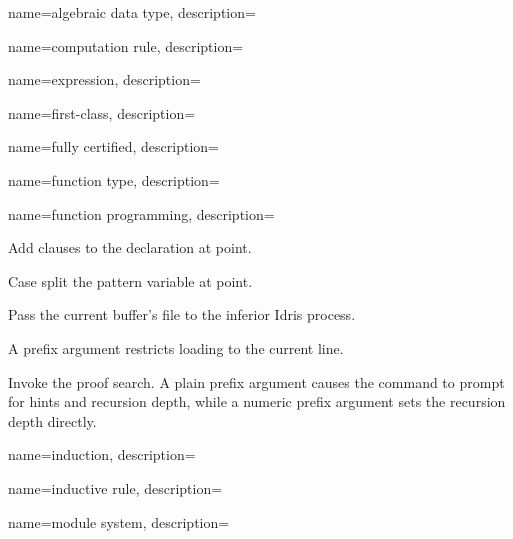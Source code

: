 {
  name={algebraic data type},
  description={}
}

{
  name={computation rule},
  description={}
}

{
  name={expression},
  description={}
}

{
  name={first-class},
  description={}
}

{
  name={fully certified},
  description={}
}

{
  name={function type},
  description={}
}

{
  name={function programming},
  description={}
}


{

  Add clauses to the declaration at point.
}

{

  Case split the pattern variable at point.
}

{

  Pass the current buffer’s file to the inferior Idris process.

  A prefix argument restricts loading to the current line.
}

{

  Invoke the proof search. A plain prefix argument causes the
  command to prompt for hints and recursion depth, while a numeric
  prefix argument sets the recursion depth directly.
}

{
  name={induction},
  description={}
}

{
  name={inductive rule},
  description={}
}

{
  name={module system},
  description={}
}

